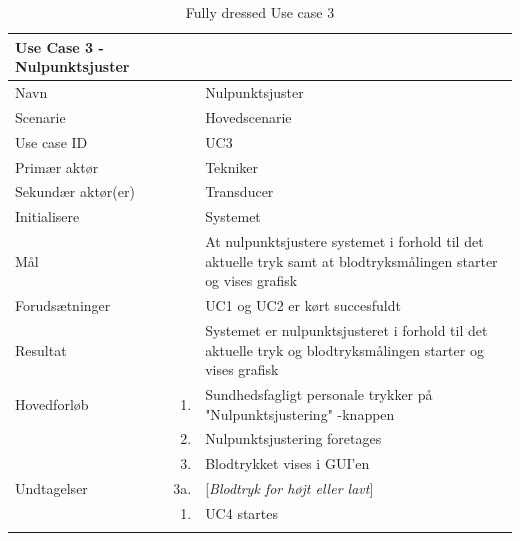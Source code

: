 
\begin{longtabu} to 
\toprule
    {\large \textbf{Use Case 3 - Nulpunktsjuster}} && \\
    \toprule
    Navn &&    Nulpunktsjuster\\
    Scenarie &&    Hovedscenarie\\
    Use case ID &&    UC3\\
    Primær aktør &&    Tekniker\\
    Sekundær aktør(er) &&   Transducer \\
    Initialisere &&    Systemet\\
    Mål &&    At nulpunktsjustere systemet i forhold til det aktuelle tryk samt at blodtryksmålingen starter og vises grafisk\\
    Forudsætninger &&    UC1 og UC2 er kørt succesfuldt\\
    Resultat &&    Systemet er nulpunktsjusteret i forhold til det aktuelle tryk og blodtryksmålingen starter og vises grafisk\\
    \toprule
    Hovedforløb &    1. &    Sundhedsfagligt personale trykker på "Nulpunktsjustering"\- -knappen\\[-1ex]
                &    2. &   Nulpunktsjustering foretages\\[-1ex]
                &    3. &    Blodtrykket vises i GUI'en\\[-1ex]
    \toprule
    Undtagelser &    3a. &    [\textit{Blodtryk for højt eller lavt}]\\[-1ex]
    &	1.	&	UC4 startes\\
                \toprule
\caption{Fully dressed Use case 3}
\label{UC3}
\end{longtabu}
\newpage

